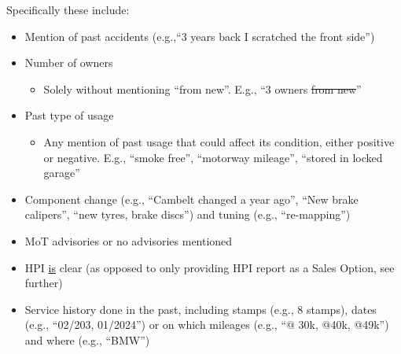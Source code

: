 \documentclass[11pt]{article}
\begin{document}
Specifically these include:
\begin{itemize}
    \item Mention of past accidents (e.g.,``3 years back I scratched the front side'')
    \item Number of owners
        \begin{itemize}
        \item  Solely without mentioning ``from new''. E.g., ``3 owners \sout{from new}''
        \end{itemize}
    \item Past type of usage 
    \begin{itemize}
        \item Any mention of past usage that could affect its condition, either positive or negative. E.g., ``smoke free'', ``motorway mileage'', ``stored in locked garage''
    \end{itemize}
  
    \item Component change (e.g., ``Cambelt changed a year ago'', ``New brake calipers'', ``new tyres, brake discs'') and tuning (e.g., ``re-mapping'')
    \item MoT advisories or no advisories mentioned
    \item HPI \underline{is} clear (as opposed to only providing HPI report as a Sales Option, see further)
    \item Service history done in the past, including stamps (e.g., 8 stamps), dates (e.g., ``02/203, 01/2024'') or on which mileages (e.g., ``@ 30k, @40k, @49k'') and where (e.g., ``BMW'')
\end{itemize}

\end{document}
